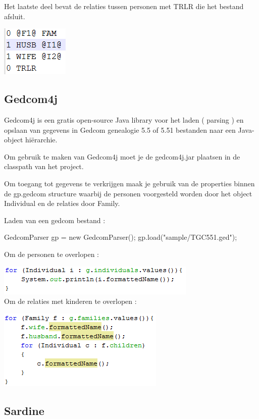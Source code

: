 \documentclass[pdftex,a4paper,12pt,twoside]{report}
\begin{document}
Het laatste deel bevat de relaties tussen personen met TRLR die het bestand afsluit.

\includegraphics{images/gedcomrelaties.png}\\



\subsection{Gedcom4j}
Gedcom4j is een gratis open-source Java library voor het laden ( parsing ) en opslaan van gegevens in Gedcom genealogie 5.5 of 5.51 bestanden naar een Java-object hiërarchie.

Om gebruik te maken van Gedcom4j moet je de gedcom4j.jar plaatsen in de classpath van het project.

Om toegang tot gegevens te verkrijgen maak je gebruik van de properties binnen de gp.gedcom structure waarbij de personen voorgesteld worden door het object Individual en de relaties door Family.

Laden van een gedcom bestand :

GedcomParser gp = new GedcomParser();
gp.load("sample/TGC551.ged");

Om de personen te overlopen  :

\includegraphics{images/gedcomindividual.png}\\

Om de relaties met kinderen te overlopen :

\includegraphics{images/gedcomfamily.png}\\

\subsection{Sardine}
\end{document}
